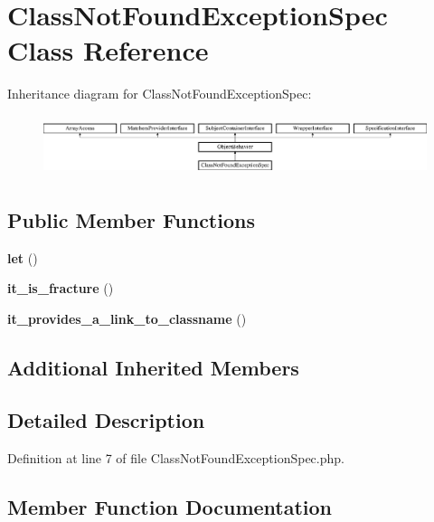 \section{Class\+Not\+Found\+Exception\+Spec Class Reference}
\label{classspec_1_1_php_spec_1_1_exception_1_1_fracture_1_1_class_not_found_exception_spec}
Inheritance diagram for Class\+Not\+Found\+Exception\+Spec\+:\begin{figure}[H]
\begin{center}
\leavevmode
\includegraphics[height=1.768421cm]{classspec_1_1_php_spec_1_1_exception_1_1_fracture_1_1_class_not_found_exception_spec}
\end{center}
\end{figure}
\subsection*{Public Member Functions}
\begin{DoxyCompactItemize}
\item 
{\bf let} ()
\item 
{\bf it\+\_\+is\+\_\+fracture} ()
\item 
{\bf it\+\_\+provides\+\_\+a\+\_\+link\+\_\+to\+\_\+classname} ()
\end{DoxyCompactItemize}
\subsection*{Additional Inherited Members}


\subsection{Detailed Description}


Definition at line 7 of file Class\+Not\+Found\+Exception\+Spec.\+php.



\subsection{Member Function Documentation}
